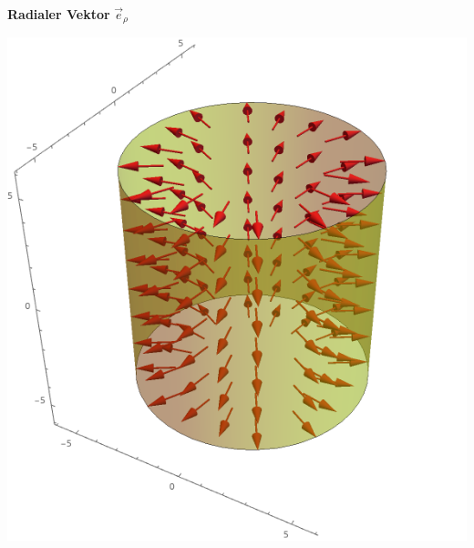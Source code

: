 \fboxsep=0pt
\begin{minipage}[t]{0.48\linewidth}

	\begin{center}

		\textbf{Radialer Vektor} $\vec{e}_\rho$

	\end{center}

	\begin{center}

		\includegraphics[scale=0.3]{zylindric_rho.png}

	\end{center}
\end{minipage}
\hfill%
